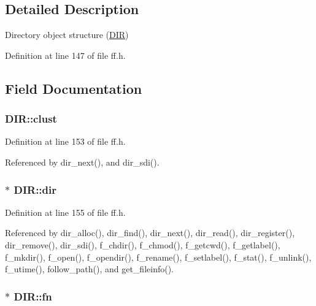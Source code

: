 \subsection{Detailed Description}
Directory object structure (\hyperlink{structDIR}{D\+IR}) 

Definition at line 147 of file ff.\+h.



\subsection{Field Documentation}
\subsubsection[{\texorpdfstring{clust}{clust}}]{ D\+I\+R\+::clust}\hypertarget{structDIR_acfbb8ba2d6e73b6f999ceffd1857c190}{}\label{structDIR_acfbb8ba2d6e73b6f999ceffd1857c190}


Definition at line 153 of file ff.\+h.



Referenced by dir\+\_\+next(), and dir\+\_\+sdi().

\subsubsection[{\texorpdfstring{dir}{dir}}]{$\ast$ D\+I\+R\+::dir}\hypertarget{structDIR_a6c2a8c0cf2d55ae99775e93a16593449}{}\label{structDIR_a6c2a8c0cf2d55ae99775e93a16593449}


Definition at line 155 of file ff.\+h.



Referenced by dir\+\_\+alloc(), dir\+\_\+find(), dir\+\_\+next(), dir\+\_\+read(), dir\+\_\+register(), dir\+\_\+remove(), dir\+\_\+sdi(), f\+\_\+chdir(), f\+\_\+chmod(), f\+\_\+getcwd(), f\+\_\+getlabel(), f\+\_\+mkdir(), f\+\_\+open(), f\+\_\+opendir(), f\+\_\+rename(), f\+\_\+setlabel(), f\+\_\+stat(), f\+\_\+unlink(), f\+\_\+utime(), follow\+\_\+path(), and get\+\_\+fileinfo().

\subsubsection[{\texorpdfstring{fn}{fn}}]{$\ast$ D\+I\+R\+::fn}\hypertarget{structDIR_a32da2f31d6c3b6c42eef981cb0cfd2ee}{}\label{structDIR_a32da2f31d6c3b6c42eef981cb0cfd2ee}


